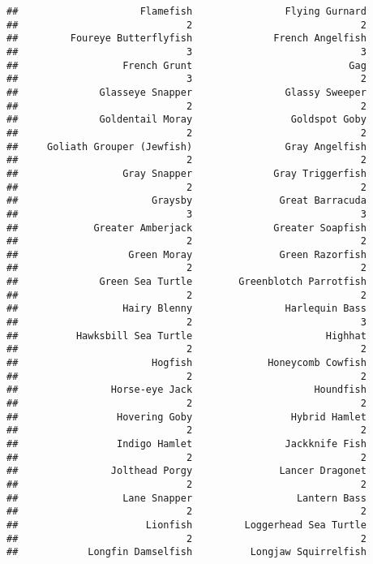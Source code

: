 \documentclass[
]{article}
\begin{document}
\begin{verbatim}
##                     Flamefish                Flying Gurnard 
##                             2                             2 
##         Foureye Butterflyfish              French Angelfish 
##                             3                             3 
##                  French Grunt                           Gag 
##                             3                             2 
##              Glasseye Snapper                Glassy Sweeper 
##                             2                             2 
##              Goldentail Moray                 Goldspot Goby 
##                             2                             2 
##     Goliath Grouper (Jewfish)                Gray Angelfish 
##                             2                             2 
##                  Gray Snapper              Gray Triggerfish 
##                             2                             2 
##                       Graysby               Great Barracuda 
##                             3                             3 
##             Greater Amberjack              Greater Soapfish 
##                             2                             2 
##                   Green Moray               Green Razorfish 
##                             2                             2 
##              Green Sea Turtle        Greenblotch Parrotfish 
##                             2                             2 
##                  Hairy Blenny                Harlequin Bass 
##                             2                             3 
##          Hawksbill Sea Turtle                       Highhat 
##                             2                             2 
##                       Hogfish             Honeycomb Cowfish 
##                             2                             2 
##                Horse-eye Jack                     Houndfish 
##                             2                             2 
##                 Hovering Goby                 Hybrid Hamlet 
##                             2                             2 
##                 Indigo Hamlet                Jackknife Fish 
##                             2                             2 
##                Jolthead Porgy               Lancer Dragonet 
##                             2                             2 
##                  Lane Snapper                  Lantern Bass 
##                             2                             2 
##                      Lionfish         Loggerhead Sea Turtle 
##                             2                             2 
##            Longfin Damselfish          Longjaw Squirrelfish 

\end{verbatim}
\end{document}
